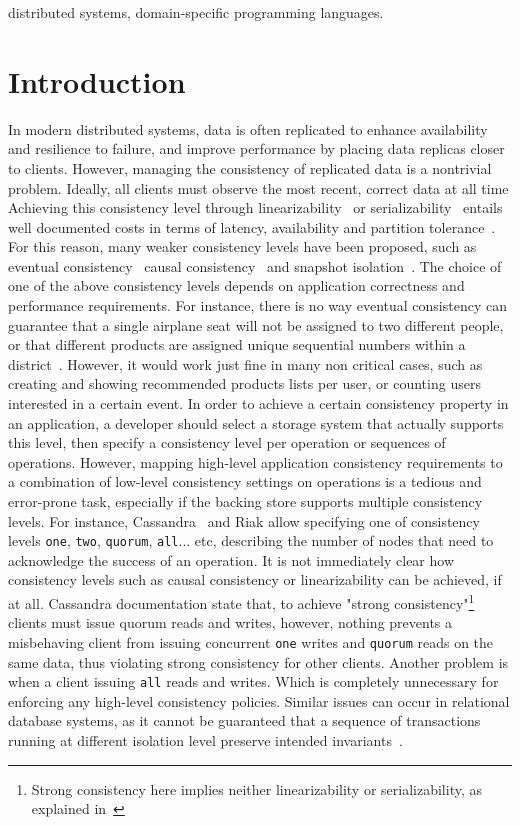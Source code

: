 \documentclass[preprint, numbers]{sigplanconf}
\begin{document}
\keywords
distributed systems, domain-specific programming languages.

\section{Introduction}
In modern distributed systems, data is often replicated 
to enhance availability and resilience to failure, and improve performance by
placing data replicas closer to clients. However, managing the consistency of 
replicated data is a nontrivial problem. Ideally, all clients must observe the most recent, correct data at all time 
Achieving this consistency level through linearizability~\cite{herlihy1990linearizability} or
serializability~\cite{papadimitriou1979serializability} entails well
documented costs in terms of latency, availability and partition
tolerance~\cite{bailis2013highly, kraska2013mdcc}. For this reason, many weaker consistency levels have been proposed,
such as eventual consistency~\cite{vogels2009eventually} causal
consistency~\cite{lamport1978time} and snapshot isolation~\cite{kemme2000database}. The choice of one of the above consistency levels depends on application
correctness and performance requirements. For instance, there is no way eventual consistency
can guarantee that a single airplane seat will not be assigned to two different
people, or that different products are assigned
unique sequential numbers within a district~\cite{bailis2014coordination, bailis2013highly}. However, it would work just fine
in many non critical cases, such as creating and showing recommended products
lists per user, or counting users interested in a certain event. In order to achieve a certain consistency
property in an application, a developer should select a storage system that
actually supports this level, then specify a consistency level per operation or
sequences of operations. However, mapping high-level application consistency requirements to  a combination of
low-level consistency settings on operations is a tedious and error-prone task, especially if
the backing store supports multiple consistency levels. For instance,
Cassandra~\cite{lakshman2010cassandra} and Riak allow specifying one of consistency levels
\texttt{one}, \texttt{two}, \texttt{quorum}, \texttt{all}... etc, describing the number of nodes that need to
acknowledge the success of an operation. It
is not immediately clear how consistency levels such as causal consistency or
linearizability can be achieved, if at all.  Cassandra documentation state that,
to achieve "strong consistency"\footnote{ Strong consistency here implies
neither linearizability or serializability, as explained in~\cite{sivaramakrishnan2016representation}} clients must issue quorum reads and writes,
however, nothing prevents a misbehaving client from issuing concurrent \texttt{one} writes and
\texttt{quorum} reads on the same data, thus violating strong consistency for other clients. Another
problem is when a client issuing \texttt{all} reads and writes. Which is completely
unnecessary for enforcing any high-level consistency policies. Similar issues
can occur in relational database systems, as it cannot be guaranteed that a
sequence of transactions running at different isolation level preserve intended
invariants~\cite{gray1992transaction}. 
\end{document}
